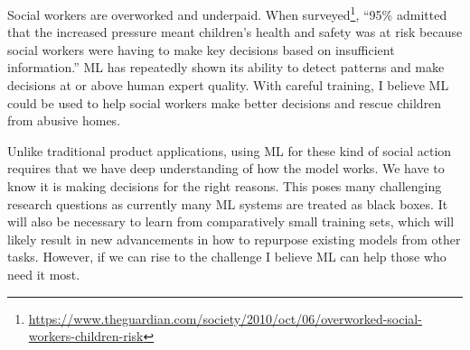 \documentclass[a4paper, 11pt]{article}
\begin{document}
Social workers are overworked and underpaid. When
surveyed\footnote{\url{https://www.theguardian.com/society/2010/oct/06/overworked-social-workers-children-risk}},
``95\% admitted that the increased pressure meant children's health and safety was at risk because social workers
were having to make key decisions based on insufficient information.'' ML has repeatedly shown
its ability to detect patterns and make decisions at or above human expert quality. With careful
training, I believe ML could be used to help social workers make better decisions and rescue children
from abusive homes.

Unlike traditional product applications, using ML for these kind of social action requires that
we have deep understanding of how the model works. We have to know it is making
decisions for the right reasons. This poses many challenging research questions
as currently many ML systems are treated as black boxes. It will also be necessary to
learn from comparatively small training sets, which will likely result in new advancements
in how to repurpose existing models from other tasks. However, if we can rise to the challenge
I believe ML can help those who need it most.





\small



\end{document}
